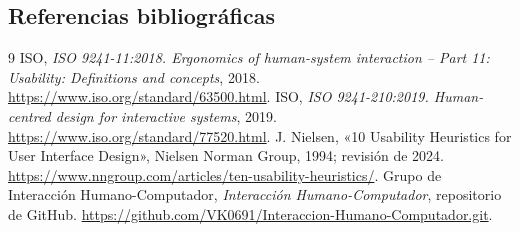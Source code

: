 \documentclass[10pt,letterpaper]{article}
\begin{document}
\subsection{Referencias bibliográficas}
\vspace{-5pt}
\begin{thebibliography}{9}\small\setlength{\itemsep}{0pt}
 ISO, \emph{ISO 9241-11:2018. Ergonomics of human-system interaction -- Part 11: Usability: Definitions and concepts}, 2018. \url{https://www.iso.org/standard/63500.html}.
 ISO, \emph{ISO 9241-210:2019. Human-centred design for interactive systems}, 2019. \url{https://www.iso.org/standard/77520.html}.
 J. Nielsen, «10 Usability Heuristics for User Interface Design», Nielsen Norman Group, 1994; revisión de 2024. \url{https://www.nngroup.com/articles/ten-usability-heuristics/}.
 Grupo de Interacción Humano-Computador, \emph{Interacción Humano-Computador}, repositorio de GitHub. \url{https://github.com/VK0691/Interaccion-Humano-Computador.git}.
\end{thebibliography}
\end{document}
